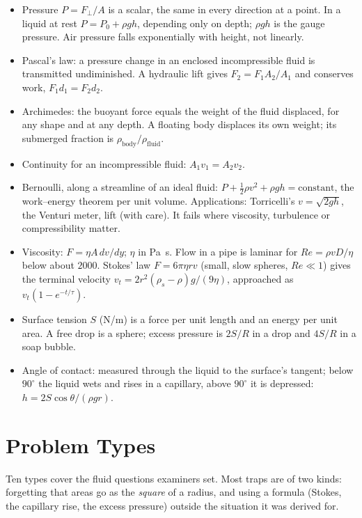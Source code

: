\begin{itemize}
\item Pressure $P=F_\perp/A$ is a scalar, the same in every direction at a point. In a liquid at rest
      $P=P_0+\rho gh$, depending only on depth; $\rho gh$ is the gauge pressure. Air pressure falls
      exponentially with height, not linearly.
\item Pascal's law: a pressure change in an enclosed incompressible fluid is transmitted undiminished. A
      hydraulic lift gives $F_2=F_1A_2/A_1$ and conserves work, $F_1d_1=F_2d_2$.
\item Archimedes: the buoyant force equals the weight of the fluid displaced, for any shape and at any depth.
      A floating body displaces its own weight; its submerged fraction is $\rho_{\text{body}}/\rho_{\text{fluid}}$.
\item Continuity for an incompressible fluid: $A_1v_1=A_2v_2$.
\item Bernoulli, along a streamline of an ideal fluid: $P+\tfrac12\rho v^2+\rho gh=\text{constant}$, the
      work--energy theorem per unit volume. Applications: Torricelli's $v=\sqrt{2gh}$, the Venturi meter,
      lift (with care). It fails where viscosity, turbulence or compressibility matter.
\item Viscosity: $F=\eta A\,dv/dy$; $\eta$ in \si{Pa.s}. Flow in a pipe is laminar for
      $Re=\rho vD/\eta$ below about $2000$. Stokes' law $F=6\pi\eta rv$ (small, slow spheres, $Re\ll1$)
      gives the terminal velocity $v_t=2r^2(\rho_s-\rho)g/(9\eta)$, approached as
      $v_t(1-e^{-t/\tau})$.
\item Surface tension $S$ (\si{N/m}) is a force per unit length and an energy per unit area. A free drop
      is a sphere; excess pressure is $2S/R$ in a drop and $4S/R$ in a soap bubble.
\item Angle of contact: measured through the liquid to the surface's tangent; below $90^\circ$ the liquid
      wets and rises in a capillary, above $90^\circ$ it is depressed: $h=2S\cos\theta/(\rho gr)$.
\end{itemize}

\section{Problem Types}\label{sec:fluids-types}
Ten types cover the fluid questions examiners set. Most traps are of two kinds: forgetting that areas go as
the \emph{square} of a radius, and using a formula (Stokes, the capillary rise, the excess pressure) outside
the situation it was derived for.

